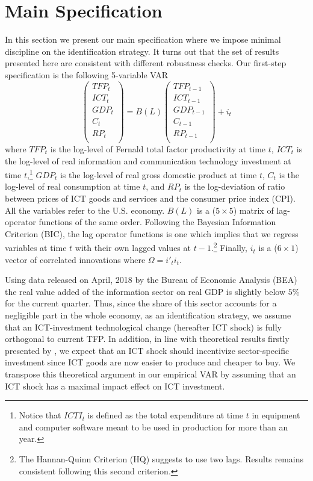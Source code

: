 \documentclass[12pt]{article}
\begin{document}
\section{Main Specification}

In this section we present our main specification where we impose minimal discipline on the identification strategy. It turns out that the set of results presented here are consistent with different robustness checks. Our first-step specification is the following 5-variable VAR 
\begin{equation}
\begin{pmatrix}
TFP_t \\ 
ICT_t \\
GDP_t \\
C_t \\
RP_t \\
\end{pmatrix} = B(L) \begin{pmatrix}
TFP_{t-1} \\ 
ICT_{t-1} \\
GDP_{t-1} \\
C_{t-1} \\
RP_{t-1} \\
\end{pmatrix} + i_t
\end{equation}
where $TFP_t$ is the log-level of Fernald total factor productivity at time $t$, $ICT_{t}$ is the log-level of real information and communication technology investment at time $t$,\footnote{Notice that $ICTI_t$ is defined as the total expenditure at time $t$ in equipment and computer software meant to be used in production for more than an year.} $GDP_t$ is the log-level of real gross domestic product at time $t$, $C_t$ is the log-level of real consumption at time $t$, and $RP_t$ is the log-deviation of ratio between prices of ICT goods and services and the consumer price index (CPI). All the variables refer to the U.S. economy. $B(L)$ is a ($5\times 5$) matrix of lag-operator functions of the same order. Following the Bayesian Information Criterion (BIC), the lag operator functions is one which implies that we regress variables at time $t$ with their own lagged values at $t-1$.\footnote{The Hannan-Quinn Criterion (HQ) suggests to use two lags. Results remains consistent following this second criterion.} Finally, $i_t$ is a ($6\times 1$) vector of correlated innovations where $\Omega = i'_t i_t$.

Using data released on April, 2018 by the Bureau of Economic Analysis (BEA) the real value added of the information sector on real GDP is slightly below $5$\% for the current quarter. Thus, since the share of this sector accounts for a negligible part in the whole economy, as an identification strategy, we assume that an ICT-investment technological change (hereafter ICT shock) is fully orthogonal to current TFP. In addition, in line with theoretical results firstly presented by \cite{greenwood1997long}, we expect that an ICT shock should incentivize sector-specific investment since ICT goods are now easier to produce and cheaper to buy. We transpose this theoretical argument in our empirical VAR by assuming that an ICT shock has a maximal impact effect on ICT investment. 
\end{document}
